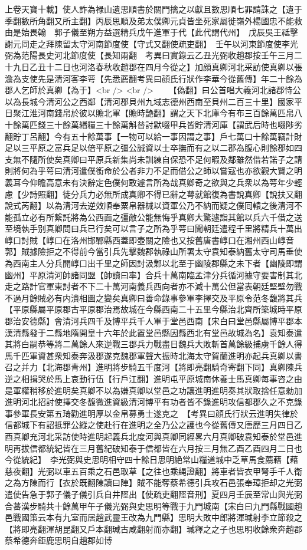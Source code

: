 上卷天寶十載】使人詐為禄山遺思順書於關門擒之以獻且數思順七罪請誅之【遺于季翻數所角翻又所主翻】丙辰思順及弟太僕卿元貞皆坐死家屬徙嶺外楊國忠不能救由是始畏翰　郭子儀至朔方益選精兵戊午進軍于代【此代謂代州】　戊辰吳王祗擊謝元同走之拜陳留太守河南節度使【守式又翻使疏吏翻】　壬午以河東節度使李光弼為范陽長史河北節度使【長知兩翻　考異曰實錄云乙丑光弼收趙郡按壬午三月二十九日乙丑十二日也河洛春秋收趙郡在四月今從之】加顔真卿河北采訪使真卿以張澹為支使先是清河客李萼【先悉薦翻考異曰顔氏行狀作李華今從舊傳】年二十餘為郡人乞師於真卿【為于】<br />
<br />
　　【偽翻】曰公首唱大義河北諸郡恃公以為長城今清河公之西鄰【清河郡貝州九域志德州西南至貝州二百三十里】國家平日聚江淮河南錢帛於彼以贍北軍【贍時艶翻】謂之天下北庫今有布三百餘萬匹帛八十餘萬匹錢三十餘萬緡糧三十餘萬斛㫺討默啜甲兵皆貯清河庫【謂武后時也啜陟劣翻貯丁呂翻】今有五十餘萬事【一物可以給一事因謂之事】戶七萬口十餘萬竊計財足以三平原之富兵足以倍平原之彊公誠資以士卒撫而有之以二郡為腹心則餘郡如四支無不隨所使矣真卿曰平原兵新集尚未訓練自保恐不足何暇及鄰雖然借若諾子之請則將何為乎萼曰清河遣僕銜命於公者非力不足而借公之師以嘗寇也亦欲觀大賢之明義耳今仰瞻高意未有決辭定色僕何敢遽言所為哉真卿奇之欲與之兵衆以為萼年少輕慮【少詩照翻】徒分兵力必無所成真卿不得已辭之萼就館復為書說真卿【說扶又翻說式芮翻】以為清河去逆效順奉粟帛器械以資軍公乃不納而疑之僕囘轅之後清河不能孤立必有所繋託將為公西面之彊敵公能無悔乎真卿大驚遽詣其館以兵六千借之送至境執手别真卿問曰兵已行矣可以言子之所為乎萼曰聞朝廷遣程千里將精兵十萬出崞口討賊【崞口在洛州邯鄲縣西蓋即壺關之險也又按舊唐書崞口在湘州西山崞音郭】賊據險拒之不得前今當引兵先擊魏郡執祿山所署太守袁知泰納舊太守司馬垂使為西南主人分兵開崞口出千里之師因討汲鄴以北至于幽陵郡縣之未下者【幽陵即謂幽州】平原清河帥諸同盟【帥讀曰率】合兵十萬南臨孟津分兵循河據守要害制其北走之路計官軍東討者不下二十萬河南義兵西向者亦不減十萬公但當表朝廷堅壁勿戰不過月餘賊必有内潰相圖之變矣真卿曰善命錄事參軍李擇交及平原令范冬馥將其兵【平原縣屬平原郡古平原郡治焉故城在今縣西南二十五里今縣治北齊所築城時平原郡治安德縣】會清河兵四千及博平兵千人軍于堂邑西南【宋白曰堂邑縣屬博平郡本漢清縣發于二縣地隋開皇十六年於此置堂邑縣因縣西北有堂邑故城為名】袁知泰遣其將白嗣恭等將二萬餘人來逆戰三郡兵力戰盡日魏兵大敗斬首萬餘級捕虜千餘人得馬千匹軍資甚衆知泰奔汲郡遂克魏郡軍聲大振時北海太守賀蘭進明亦起兵真卿以書召之并力【北海郡青州】進明將步騎五千度河【將即亮翻騎奇寄翻下同】真卿陳兵逆之相揖哭於馬上哀動行伍【行戶江翻】進明屯平原城南休養士馬真卿每事咨之由是軍權稍移於進明矣真卿不以為嫌真卿以堂邑之功讓進明進明奏其狀取捨任意勑加進明河北招討使擇交冬馥微進資級清河博平有功者皆不錄進明攻信都郡久之不克錄事參軍長安第五琦勸進明厚以金帛募勇士遂克之　【考異曰顔氏行狀云進明失律於信都城下有詔抵罪公縱之使赴行在進明之全乃公之護也今從舊傳又唐歷三月四日乙酉真卿充河北采訪使時進明起義兵北度河與真卿同經畧六月真卿破袁知泰於堂邑進明再拔信都統紀皆在三月舊紀破知泰于信都皆在六月按三月無乙酉乙酉四月二日也今從統紀】　李光弼與史思明相守四十餘日思明絶常山糧道城中乏草馬食薦藉【藉慈夜翻】光弼以車五百乘之石邑取草【之往也乘䋲證翻】將車者皆衣甲弩手千人衛之為方陳而行【衣於既翻陳讀曰陣】賊不能奪蔡希德引兵攻石邑張奉璋拒却之光弼遣使告急于郭子儀子儀引兵自井陘出【使疏吏翻陘音刑】夏四月壬辰至常山與光弼合蕃漢步騎共十餘萬甲午子儀光弼與史思明等戰于九門城南【宋白曰九門縣戰國趙邑戰國策云本有九室而居趙武靈王改為九門縣】思明大敗中郎將渾瑊射李立節殺之【將即亮翻渾胡昆翻又戶本翻瑊古咸翻射而亦翻】瑊釋之之子也思明收餘衆奔趙郡蔡希德奔鉅鹿思明自趙郡如博